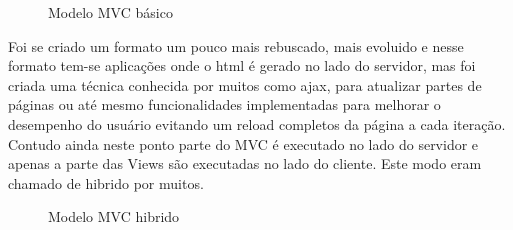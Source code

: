 \begin{figure}[ht]
    \centering
    \caption{Modelo MVC básico}
    \label{submeter}
\end{figure}

Foi se criado um formato um pouco mais rebuscado, mais evoluido e nesse formato tem-se aplicações onde o html é gerado no lado do servidor, mas foi criada uma técnica conhecida
por muitos como ajax, para atualizar partes de páginas ou até mesmo funcionalidades implementadas para melhorar o desempenho do usuário evitando um reload completos
da página a cada iteração. Contudo ainda neste ponto parte do MVC é executado no lado do servidor e apenas a parte das Views são executadas no lado do cliente. Este modo eram
chamado de hibrido por muitos.

\begin{figure}[ht]
    \centering
    \caption{Modelo MVC hibrido}
    \label{submeter}
\end{figure}

